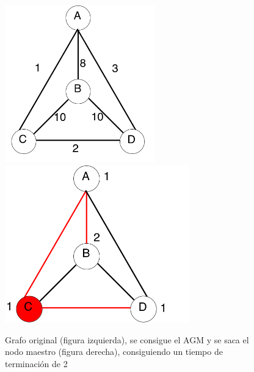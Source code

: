 \documentclass[a4paper, 10pt, twoside]{article}
\begin{document}
\begin{figure}[H]
\centering
\includegraphics[width=65mm]{contraej.png}
\includegraphics[width=80mm]{contraejMasterC.png}
\caption{Grafo original (figura izquierda), se consigue el AGM y se saca el nodo maestro (figura derecha), consiguiendo un tiempo de terminación de 2}
\end{figure} 
\end{document}
